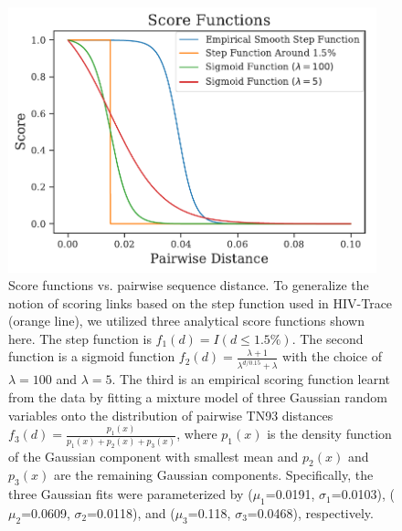 \documentclass[a4paper,11pt]{article}
\begin{document}
\clearpage

\begin{figure}[!h]
\centering
\includegraphics[width=0.95\textwidth]{figs/riskiness_score_functions_zoomed.pdf}
\caption{Score functions vs. pairwise sequence distance.
To generalize the notion of scoring links based on the step function used in HIV-Trace (orange line),
we utilized three analytical score functions shown here.
The step function is $f_1(d)=I\left(d\le1.5\%\right)$.
The second function is a sigmoid function $f_2(d)=\frac{\lambda+1}{\lambda^{d/0.15}+\lambda}$ with the choice of $\lambda=100$  and $\lambda=5$.
The third is an empirical scoring function learnt from the data by fitting a mixture model of three Gaussian random variables onto the distribution of pairwise TN93 distances $f_3(d)=\frac{p_1(x)}{p_1(x)+p_2(x)+p_3(x)}$, where $p_1(x)$ is the density function of the Gaussian component with smallest mean and $p_2(x)$ and $p_3(x)$ are the remaining Gaussian components.
Specifically, the three Gaussian fits were parameterized by ($\mu_1$=0.0191, $\sigma_1$=0.0103), ($\mu_2$=0.0609, $\sigma_2$=0.0118), and ($\mu_3$=0.118, $\sigma_3$=0.0468), respectively.
}
\label{fig:scorefuncs}
\end{figure}

\clearpage
\end{document}
